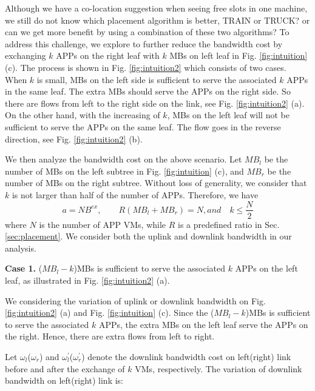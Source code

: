 \documentclass[10pt, conference, letterpaper]{IEEEtran}
\begin{document}
Although we have a co-location suggestion when seeing free slots in one machine, we still do not know which placement algorithm is better, TRAIN or TRUCK? or can we get more benefit by using a combination of these two algorithms? To address this challenge, we explore to further reduce the bandwidth cost by exchanging $k$ APPs on the right leaf with $k$ MBs on left leaf in Fig. \ref{fig:intuition} (c). The process is shown in Fig. \ref{fig:intuition2} which consists of two cases. When $k$ is small, MBs on the left side is sufficient to serve the associated $k$ APPs in the same leaf. The extra MBs should serve the APPs on the right side. So there are flows from left to the right side on the link, see Fig. \ref{fig:intuition2} (a). On the other hand, with the increasing of $k$, MBs on the left leaf will not be sufficient to serve the APPs on the same leaf. The flow goes in the reverse direction, see Fig. \ref{fig:intuition2} (b). 

We then analyze the bandwidth cost on the above scenario. Let $MB_l$ be the number of MBs on the left subtree in Fig. \ref{fig:intuition} (c), and $MB_r$ be the number of MBs on the right subtree. Without loss of generality, we consider that $k$ is not larger than half of the number of APPs. Therefore, we have 
\begin{equation}
a = NB^{ex}, \qquad R(MB_l+MB_r) = N, and \quad k\leq \frac{N}{2}
\end{equation}
where $N$ is the number of APP VMs, while $R$ is a predefined ratio in Sec. \ref{sec:placement}.  We consider both the uplink and downlink bandwidth in our analysis.

\textbf{Case 1. } ($MB_l-k$)MBs is sufficient to serve the associated $k$ APPs on the left leaf, as illustrated in Fig. \ref{fig:intuition2} (a).

We considering the variation of uplink or downlink bandwidth on Fig. \ref{fig:intuition2} (a) and Fig. \ref{fig:intuition} (c). Since the ($MB_l-k$)MBs is sufficient to serve the associated $k$ APPs, the extra MBs on the left leaf serve the APPs on the right. Hence, there are extra flows from left to right.

Let $\omega_l$($\omega_r$) and $\omega_l^{'}$($\omega_r^{'}$) denote the downlink bandwidth cost on left(right) link before and after the exchange of $k$ VMs, respectively. The variation of downlink bandwidth on left(right) link is:
\end{document}
